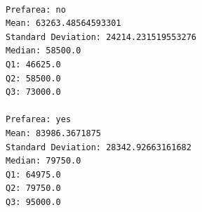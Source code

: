 \documentclass[11pt]{article}
\makeatletter
\newcommand{\boxspacing}{\kern\kvtcb@left@rule\kern\kvtcb@boxsep}
\newcommand{\prompt}[4]{
        {\ttfamily\llap{{\color{#2}[#3]:\hspace{3pt}#4}}\vspace{-\baselineskip}}
    }
\makeatother
\begin{document}
    \begin{Verbatim}[commandchars=\\\{\}]

Prefarea: no
Mean: 63263.48564593301
Standard Deviation: 24214.231519553276
Median: 58500.0
Q1: 46625.0
Q2: 58500.0
Q3: 73000.0

Prefarea: yes
Mean: 83986.3671875
Standard Deviation: 28342.92663161682
Median: 79750.0
Q1: 64975.0
Q2: 79750.0
Q3: 95000.0
    \end{Verbatim}

    \begin{tcolorbox}[breakable, size=fbox, boxrule=1pt, pad at break*=1mm,colback=cellbackground, colframe=cellborder]
\prompt{In}{incolor}{ }{\boxspacing}
\begin{Verbatim}[commandchars=\\\{\}]

\end{Verbatim}
\end{tcolorbox}


    
    
    
\end{document}
